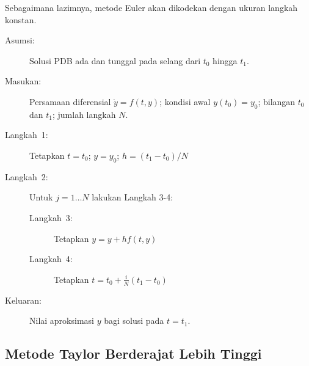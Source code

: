 Sebagaimana lazimnya, metode Euler akan dikodekan dengan ukuran langkah
konstan.

\begin{pseudocode} 
\begin{description}
\item [{Asumsi:}] Solusi PDB ada dan tunggal pada selang dari $t_{0}$
hingga $t_{1}$.
\item [{Masukan:}] Persamaan diferensial $\dot{y}=f(t,y)$; kondisi awal
$y(t_{0})=y_{0}$; bilangan $t_{0}$ dan $t_{1}$; jumlah langkah
$N$.
\item [{Langkah\ 1:}] Tetapkan $t=t_{0}$; $y=y_{0}$; $h=(t_{1}-t_{0})/N$
\item [{Langkah~2:}] Untuk $j=1\ldots N$ lakukan Langkah 3-4:

\begin{description}
\item [{Langkah~3:}] Tetapkan $y=y+hf(t,y)$
\item [{Langkah~4:}] Tetapkan $t=t_{0}+\frac{i}{N}(t_{1}-t_{0})$
\end{description}
\item [{Keluaran:}] Nilai aproksimasi $y$ bagi solusi pada $t=t_{1}$.
\end{description}
\end{pseudocode}  

\subsection{Metode Taylor Berderajat Lebih Tinggi}


